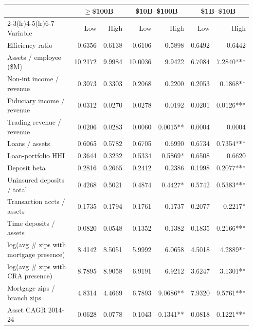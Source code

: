 \begin{tabular}{lrrrrrr}
\toprule
 & \multicolumn{2}{c}{$\geq$\$100B} & \multicolumn{2}{c}{\$10B--\$100B} & \multicolumn{2}{c}{\$1B--\$10B} \\
\cmidrule(lr){2-3}\cmidrule(lr){4-5}\cmidrule(lr){6-7}
Variable & Low & High & Low & High & Low & High \\
\midrule
Efficiency ratio & 0.6356 & 0.6138 & 0.6106 & 0.5898 & 0.6492 & 0.6442 \\
Assets / employee (\$M) & 10.2172 & 9.9984 & 10.0036 & 9.9422 & 6.7084 & 7.2840*** \\
Non-int income / revenue & 0.3073 & 0.3303 & 0.2068 & 0.2200 & 0.2053 & 0.1868** \\
Fiduciary income / revenue & 0.0312 & 0.0270 & 0.0278 & 0.0192 & 0.0201 & 0.0126*** \\
Trading revenue / revenue & 0.0206 & 0.0283 & 0.0060 & 0.0015** & 0.0004 & 0.0004 \\
Loans / assets & 0.6065 & 0.5782 & 0.6705 & 0.6990 & 0.6734 & 0.7354*** \\
Loan-portfolio HHI & 0.3644 & 0.3232 & 0.5334 & 0.5869* & 0.6508 & 0.6620 \\
Deposit beta & 0.2816 & 0.2665 & 0.2412 & 0.2386 & 0.1998 & 0.2077*** \\
Uninsured deposits / total & 0.4268 & 0.5021 & 0.4874 & 0.4427* & 0.5742 & 0.5383*** \\
Transaction accts / assets & 0.1735 & 0.1794 & 0.1761 & 0.1737 & 0.2077 & 0.2217* \\
Time deposits / assets & 0.0820 & 0.0548 & 0.1352 & 0.1382 & 0.1835 & 0.2166*** \\
log(avg \# zips with mortgage presence) & 8.4142 & 8.5051 & 5.9992 & 6.0658 & 4.5018 & 4.2889** \\
log(avg \# zips with CRA presence) & 8.7895 & 8.9058 & 6.9191 & 6.9212 & 3.6247 & 3.1301** \\
Mortgage zips / branch zips & 4.8314 & 4.4669 & 6.7893 & 9.0686** & 7.9320 & 9.5761*** \\
Asset CAGR 2014-24 & 0.0628 & 0.0778 & 0.1043 & 0.1341** & 0.0818 & 0.1221*** \\
\bottomrule
\end{tabular}

